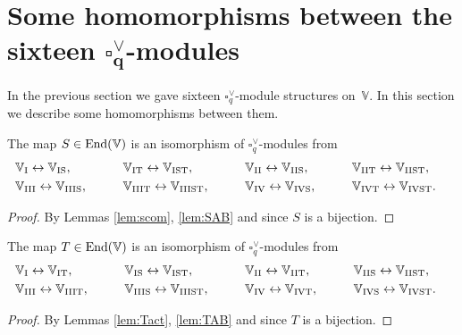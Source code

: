 \section[Some homomorphisms between the sixteen $\square^\vee_q$-modules]{Some homomorphisms between the sixteen $\boldsymbol{\square^\vee_q}$-modules}\label{section12}

In the previous section we gave sixteen $\square^\vee_q$-module structures on~$\mathbb V$. In this section
we describe some homomorphisms between them.

\begin{Lemma}\label{lem:SIso}The map $S \in {\rm End}(\mathbb V)$ is an isomorphism of
 $\square^\vee_q$-modules from
\begin{alignat*}{5}
&
\mathbb V_{\rm I} \leftrightarrow \mathbb V_{\rm IS}, \qquad &&
\mathbb V_{\rm IT} \leftrightarrow \mathbb V_{\rm IST}, \qquad &&
\mathbb V_{\rm II} \leftrightarrow \mathbb V_{\rm IIS}, \qquad &&
\mathbb V_{\rm IIT} \leftrightarrow \mathbb V_{\rm IIST}, &
\\
&\mathbb V_{\rm III} \leftrightarrow \mathbb V_{\rm IIIS}, \qquad &&
\mathbb V_{\rm IIIT} \leftrightarrow \mathbb V_{\rm IIIST}, \qquad &&
\mathbb V_{\rm IV} \leftrightarrow \mathbb V_{\rm IVS}, \qquad &&
\mathbb V_{\rm IVT} \leftrightarrow \mathbb V_{\rm IVST}.&
\end{alignat*}
\end{Lemma}
\begin{proof} By Lemmas \ref{lem:scom}, \ref{lem:SAB} and since $S$ is a bijection.
\end{proof}

\begin{Lemma}\label{lem:TIso}The map $T \in {\rm End}(\mathbb V)$ is an isomorphism of $\square^\vee_q$-modules from
\begin{alignat*}{5}
&
\mathbb V_{\rm I} \leftrightarrow \mathbb V_{\rm IT}, \qquad &&
\mathbb V_{\rm IS} \leftrightarrow\mathbb V_{\rm IST}, \qquad &&
\mathbb V_{\rm II} \leftrightarrow \mathbb V_{\rm IIT}, \qquad &&
\mathbb V_{\rm IIS} \leftrightarrow \mathbb V_{\rm IIST},&
\\
&\mathbb V_{\rm III} \leftrightarrow \mathbb V_{\rm IIIT}, \qquad &&
\mathbb V_{\rm IIIS} \leftrightarrow \mathbb V_{\rm IIIST}, \qquad &&
\mathbb V_{\rm IV} \leftrightarrow \mathbb V_{\rm IVT}, \qquad &&
\mathbb V_{\rm IVS} \leftrightarrow \mathbb V_{\rm IVST}.&
\end{alignat*}
\end{Lemma}
\begin{proof} By Lemmas \ref{lem:Tact}, \ref{lem:TAB} and since $T$ is a bijection.
\end{proof}


